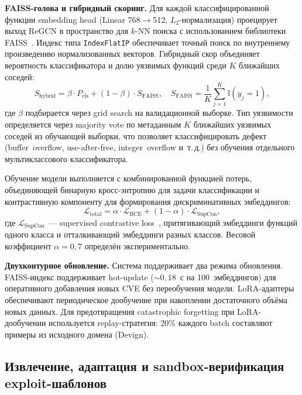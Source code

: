 \documentclass[runningheads]{llncs}
\begin{document}
\textbf{FAISS-голова и гибридный скоринг.} Для каждой классифицированной функции embedding head (Linear 768$\to$512, $L_2$-нормализация) проецирует выход ReGCN в пространство для $k$-NN поиска с использованием библиотеки FAISS~\cite{johnson2019faiss}. Индекс типа \texttt{IndexFlatIP} обеспечивает точный поиск по внутреннему произведению нормализованных векторов. Гибридный скор объединяет вероятность классификатора и долю уязвимых функций среди $K$ ближайших соседей:
\begin{equation}
    S_{\text{hybrid}} = \beta \cdot P_{\text{cls}} + (1 - \beta) \cdot S_{\text{FAISS}}, \quad S_{\text{FAISS}} = \frac{1}{K}\sum_{j=1}^{K} \mathbb{I}(y_j = 1),
    \label{eq:hybrid}
\end{equation}
где $\beta$ подбирается через grid search на валидационной выборке. Тип уязвимости определяется через majority vote по метаданным $K$ ближайших уязвимых соседей из обучающей выборки, что позволяет классифицировать дефект (buffer~overflow, use-after-free, integer~overflow и~т.\,д.) без обучения отдельного мультиклассового классификатора.

Обучение модели выполняется с комбинированной функцией потерь, объединяющей бинарную кросс-энтропию для задачи классификации и контрастивную компоненту для формирования дискриминативных эмбеддингов:
\begin{equation}
    \mathcal{L}_{\text{total}} = \alpha \cdot \mathcal{L}_{\text{BCE}} + (1 - \alpha) \cdot \mathcal{L}_{\text{SupCon}},
    \label{eq:loss}
\end{equation}
где $\mathcal{L}_{\text{SupCon}}$~--- supervised contrastive loss~\cite{khosla2020supcon}, притягивающий эмбеддинги функций одного класса и отталкивающий эмбеддинги разных классов. Весовой коэффициент $\alpha = 0{,}7$ определён экспериментально.

\textbf{Двухконтурное обновление.} Система поддерживает два режима обновления. FAISS-индекс поддерживает hot-update (${\sim}0{,}18$~с на 100~эмбеддингов) для оперативного добавления новых CVE без переобучения модели. LoRA-адаптеры обеспечивают периодическое дообучение при накоплении достаточного объёма новых данных. Для предотвращения catastrophic forgetting при LoRA-дообучении используется replay-стратегия: 20\% каждого batch составляют примеры из исходного домена (Devign).


\subsection{Извлечение, адаптация и sandbox-верификация exploit-шаблонов}
\end{document}
